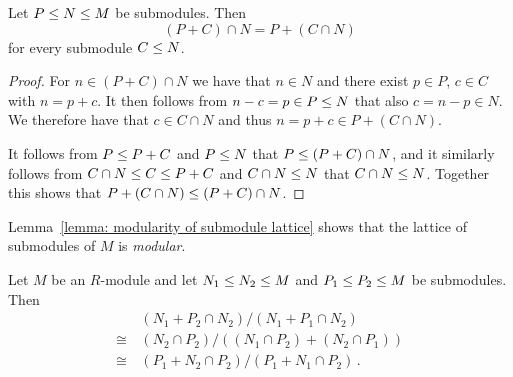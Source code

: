\begin{lemma}
  \label{lemma: modularity of submodule lattice}
  Let $P \leq N \leq M$ be submodules.
  Then
  \[
      (P + C) \cap N
    = P + (C \cap N)
  \]
  for every submodule $C \leq N$.
\end{lemma}


\begin{proof}
  For $n \in (P + C) \cap N$ we have that $n \in N$ and there exist $p \in P$, $c \in C$ with $n = p + c$.
  It then follows from $n - c = p \in P \leq N$ that also $c = n - p \in N$.
  We therefore have that $c \in C \cap N$ and thus $n = p + c \in P + (C \cap N)$.
  
  It follows from $P \leq P + C$ and $P \leq N$ that $P \leq (P + C) \cap N$, and it similarly follows from $C \cap N \leq C \leq P + C$ and $C \cap N \leq N$ that $C \cap N \leq N$.
  Together this shows that $P + (C \cap N) \leq (P + C) \cap N$.
\end{proof}


\begin{remark}
  Lemma~\ref{lemma: modularity of submodule lattice} shows that the lattice of submodules of $M$ is \emph{modular}.
\end{remark}


\begin{lemma}
  \label{lemma: butterfly lemma}
  Let $M$ be an $R$-module and let $N_1 \leq N_2 \leq M$ and $P_1 \leq P_2 \leq M$ be submodules.
  Then
  \begin{align*}
         &\,  (N_1 + P_2 \cap N_2)/(N_1 + P_1 \cap N_2)         \\
    \cong&\,  (N_2 \cap P_2)/((N_1 \cap P_2) + (N_2 \cap P_1))  \\
    \cong&\,  (P_1 + N_2 \cap P_2)/(P_1 + N_1 \cap P_2) \,.
  \end{align*}
\end{lemma}


